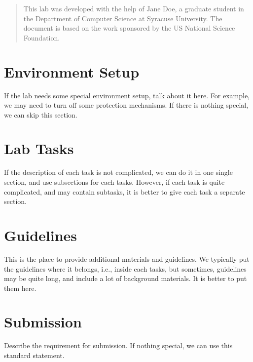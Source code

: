 \begin{quote}
This lab was developed with the help of Jane Doe, a graduate student
in the Department of Computer Science at Syracuse University.
The document is based on the work sponsored by the US National Science Foundation.
\end{quote}




\section{Environment Setup}

If the lab needs some special environment setup, talk about it here. 
For example, we may need to turn off some protection mechanisms. 
If there is nothing special, we can skip this section.



\section{Lab Tasks} 

If the description of each task is not complicated, we can 
do it in one single section, and use subsections for each
tasks. However, if each task is quite complicated, and may
contain subtasks, it is better to give each task a 
separate section. 




\section{Guidelines}

This is the place to provide additional materials and guidelines. We typically 
put the guidelines where it belongs, i.e., inside each tasks, but 
sometimes, guidelines may be quite long, and include a lot of background 
materials. It is better to put them here. 



\section{Submission}

Describe the requirement for submission. If nothing special, we can
use this standard statement. 

\begin{quote}
\seedsubmission
\end{quote}






